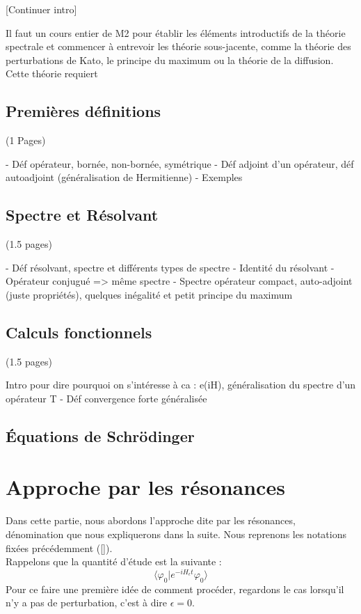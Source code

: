 \documentclass[12pt,openany,a4paper, titlepage]{article}
\newcommand{\vp}{\varphi}
\theoremstyle{definition}
\theoremstyle{definition}
\theoremstyle{definition}
\theoremstyle{definition}
\theoremstyle{definition}
\theoremstyle{definition}
\begin{document}
[Continuer intro]

Il faut un cours entier de M2 pour établir les éléments introductifs de la théorie spectrale et commencer à entrevoir les théorie sous-jacente, comme la théorie des perturbations de Kato, le principe du maximum ou la théorie de la diffusion. Cette théorie requiert 

\subsection{Premières définitions} (1 Pages)

- Déf opérateur, bornée, non-bornée, symétrique
- Déf adjoint d'un opérateur, déf autoadjoint (généralisation de Hermitienne)
- Exemples

\subsection{Spectre et Résolvant} (1.5 pages)

- Déf résolvant, spectre et différents types de spectre
- Identité du résolvant
- Opérateur conjugué => même spectre
- Spectre opérateur compact, auto-adjoint (juste propriétés), quelques inégalité et petit principe du maximum


\subsection{Calculs fonctionnels} (1.5 pages)

Intro pour dire pourquoi on s'intéresse à ca : e(iH), généralisation du spectre d'un opérateur T
- Déf convergence forte généralisée

\subsection{Équations de Schrödinger}



\newpage
\section{Approche par les résonances}

Dans cette partie, nous abordons l'approche dite par les résonances, dénomination que nous expliquerons dans la suite. Nous reprenons les notations fixées précédemment ([]). \\

Rappelons que la quantité d'étude est la suivante : 
\begin{equation}
    \langle \vp_0 | e^{-iH_\epsilon t} \vp_0 \rangle
\end{equation}
Pour ce faire une première idée de comment procéder, regardons le cas lorsqu'il n'y a pas de perturbation, c'est à dire $\epsilon = 0$. 
\end{document}

